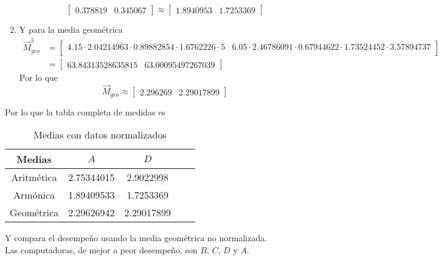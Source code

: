 \documentclass[]{article}
\begin{document}
\begin{enumerate}
{\[            \begin{bmatrix}
                0.378819 & 0.345067
            \end{bmatrix}
            \approx 
            \begin{bmatrix}
                1.8940953 & 1.7253369
            \end{bmatrix}
            \]
        }
        \item {
            Y para la media geométrica
            \begin{align*}
                \vec{M}_{geo} ^{5}
                &= 
                \begin{bmatrix}
                    4.15 \cdot 2.04214963 \cdot 0.89882854 \cdot 1.6762226 \cdot 5 
                    & 6.05 \cdot 2.46786091 \cdot 0.67944622 \cdot 1.73524452 \cdot 3.57894737\\
                \end{bmatrix} \\
                &= 
                \begin{bmatrix}
                    63.84313528635815 & 63.00095497267039
                \end{bmatrix}
            \end{align*}
            Por lo que 
            \[\vec{M}_{geo} \approx 
            \begin{bmatrix}
                2.296269 & 2.29017899
            \end{bmatrix}
            \]
        }    
        
    \end{enumerate}
    Por lo que la tabla completa de medidas es 
    \begin{table}[H]
        \centering
        \caption{Medias con datos normalizados}
        \begin{tabular}{|c|c|c|c|c|}
            \hline
             Medias & $A$ & $D$ \\
            \hline
            Aritmética & 2.75344015 & 2.9022998   \\
            Armónica & 1.89409533 & 1.7253369 \\
            Geométrica & 2.29626942 & 2.29017899 \\
            \hline
        \end{tabular}
    \end{table}
    
    Y compara el desempeño usando la media geométrica no normalizada.\\
    Las computadoras, de mejor a peor desempeño, son $B$, $C$, $D$ y $A$.
\end{document}
